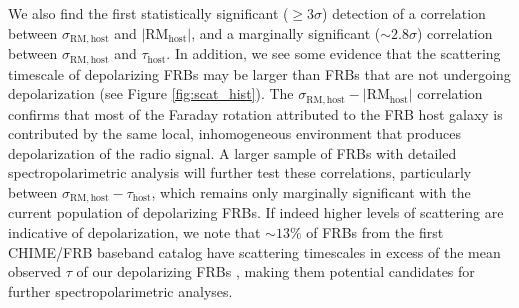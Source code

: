 \documentclass[twocolumn, linenumbers]{aastex701}
\begin{document}
We also find the first statistically significant ($\geq 3 \sigma$) detection of a correlation between $\sigma_\mathrm{RM,host}$ and $|\mathrm{RM}_\mathrm{host}|$, and a marginally significant ($\sim 2.8 \sigma$) correlation between $\sigma_\mathrm{RM,host}$ and $\tau_\mathrm{host}$. In addition, we see some evidence that the scattering timescale of depolarizing FRBs may be larger than FRBs that are not undergoing depolarization (see Figure \ref{fig:scat_hist}). The $\sigma_\mathrm{RM,host}-|\mathrm{RM}_\mathrm{host}|$ correlation confirms that most of the Faraday rotation attributed to the FRB host galaxy is contributed by the same local, inhomogeneous environment that produces depolarization of the radio signal. A larger sample of FRBs with detailed spectropolarimetric analysis will further test these correlations, particularly between $\sigma_\mathrm{RM,host}-\tau_\mathrm{host}$, which remains only marginally significant with the current population of depolarizing FRBs. If indeed higher levels of scattering are indicative of depolarization, we note that $\sim 13\%$ of FRBs from the first CHIME/FRB baseband catalog have scattering timescales in excess of the mean observed $\tau$ of our depolarizing FRBs \citep{2025ApJ...979..160S}, making them potential candidates for further spectropolarimetric analyses.
\end{document}
